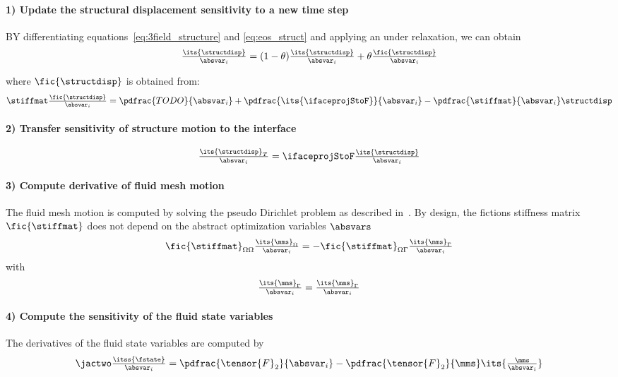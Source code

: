 \documentclass[../main.tex]{subfiles}
\begin{document}
\paragraph{1) Update the structural displacement sensitivity to a new time step}
BY differentiating equations~\eqref{eq:3field_structure} and \eqref{eq:eos_struct} and applying an under relaxation, we can obtain
\begin{align}\label{eq:underrelax_structdisp}
\tfrac{\its{\structdisp}}{\absvar_i} =
(1-\theta)
\tfrac{\its{\structdisp}}{\absvar_i} +
\theta \tfrac{\fic{\structdisp}}{\absvar_i}
\end{align}

where $\fic{\structdisp}$ is obtained from:
\begin{align}\label{eq:fictious_structdisp}
\stiffmat \tfrac{\fic{\structdisp}}{\absvar_i} =
\pdfrac{TODO}{\absvar_i} + \pdfrac{\its{\ifaceprojStoF}}{\absvar_i} -
\pdfrac{\stiffmat}{\absvar_i} \structdisp
\end{align}


\paragraph{2) Transfer sensitivity of structure motion to the interface}
\begin{equation}\label{eq:interface_projections}
\tfrac{\its{\structdisp}_T}{\absvar_i} =
\ifaceprojStoF \tfrac{\its{\structdisp}}{\absvar_i}
\end{equation}


\paragraph{3) Compute derivative of fluid mesh motion}
The fluid mesh motion is computed by solving the pseudo Dirichlet problem as described in~\cite{Farhat1995}. By design, the fictions stiffness matrix $\fic{\stiffmat}$ does not depend on the abstract optimization variables $\absvars$
\begin{align}\label{eq:mms_domain}
\fic{\stiffmat}_{\Omega \Omega}  \tfrac{\its{\mms}_{\Omega}}{\absvar_i} =
-\fic{\stiffmat}_{\Omega \Gamma} \tfrac{\its{\mms}_{\Gamma}}{\absvar_i}
\end{align}
with
\begin{align}
\tfrac{\its{\mms}_{\Gamma}}{\absvar_i} =
\tfrac{\its{\mms}_{\Gamma}}{\absvar_i}
\end{align}


\paragraph{4) Compute the sensitivity of the fluid state variables}
The derivatives of the fluid state variables are computed by
\begin{align}
\jactwo \tfrac{\itss{\fstate}}{\absvar_i} =
\pdfrac{\tensor{F}_2}{\absvar_i} - \pdfrac{\tensor{F}_2}{\mms} \its{\tfrac{\mms}{\absvar_i}}
\end{align}
\end{document}
